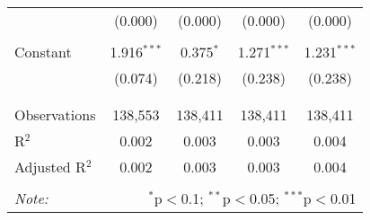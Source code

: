 \begin{table}[!htbp]
\begin{tabular}{@{\extracolsep{-5pt}}lcccc}
  & (0.000) & (0.000) & (0.000) & (0.000) \\ 
  & & & & \\ 
 Constant & 1.916$^{***}$ & 0.375$^{*}$ & 1.271$^{***}$ & 1.231$^{***}$ \\ 
  & (0.074) & (0.218) & (0.238) & (0.238) \\ 
  & & & & \\ 
\hline \\[-1.8ex] 
Observations & 138,553 & 138,411 & 138,411 & 138,411 \\ 
R$^{2}$ & 0.002 & 0.003 & 0.003 & 0.004 \\ 
Adjusted R$^{2}$ & 0.002 & 0.003 & 0.003 & 0.004 \\ 
\hline 
\hline \\[-1.8ex] 
\textit{Note:}  & \multicolumn{4}{r}{$^{*}$p$<$0.1; $^{**}$p$<$0.05; $^{***}$p$<$0.01} \\ 
\end{tabular} 
\end{table} 
